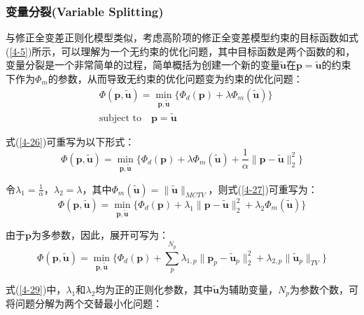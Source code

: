 \documentclass[12pt]{article}
\begin{document}
\subsubsection{变量分裂(Variable Splitting)}
与修正全变差正则化模型类似，考虑高阶项的修正全变差模型约束的目标函数如式(\ref{4-5})所示，可以理解为一个无约束的优化问题，其中目标函数是两个函数的和，变量分裂是一个非常简单的过程，简单概括为创建一个新的变量$\tilde{\boldsymbol{u}}$在$\boldsymbol{p}=\tilde{\boldsymbol{u}}$的约束下作为$\Phi_m$的参数，从而导致无约束的优化问题变为约束的优化问题：
\begin{equation}\label{4-26}
\begin{aligned}
&\Phi(\boldsymbol{p},\tilde{\boldsymbol{u}})=\min_{\boldsymbol{p},\tilde{\boldsymbol{u}}}\{\Phi_d(\boldsymbol{p})+\lambda \Phi_m(\tilde{\boldsymbol{u}})\}\\
&\text{subject to} \quad \boldsymbol{p}=\tilde{\boldsymbol{u}}
\end{aligned}
\end{equation}
\par
式(\ref{4-26})可重写为以下形式：
\begin{equation}\label{4-27}
\Phi(\boldsymbol{p},\tilde{\boldsymbol{u}})=\min_{\boldsymbol{p},\tilde{\boldsymbol{u}}}\{\Phi_d(\boldsymbol{p})+\lambda \Phi_m(\tilde{\boldsymbol{u}})+\frac{1}{\alpha} \parallel \boldsymbol{p}-\tilde{\boldsymbol{u}} \parallel_2^2\}
\end{equation}
\par
令$\lambda_1=\frac{1}{\alpha}$，$\lambda_2=\lambda$，其中$\Phi_m(\tilde{\boldsymbol{u}})=\parallel \tilde{\boldsymbol{u}} \parallel_{MCTV}$，则式(\ref{4-27})可重写为：
\begin{equation}\label{4-28}
\Phi(\boldsymbol{p},\tilde{\boldsymbol{u}})=\min_{\boldsymbol{p},\tilde{\boldsymbol{u}}}\{\Phi_d(\boldsymbol{p})+\lambda_1 \parallel \boldsymbol{p}-\tilde{\boldsymbol{u}} \parallel_2^2 +\lambda_2 \Phi_m(\tilde{\boldsymbol{u}})\}
\end{equation}
\par
由于$\boldsymbol{p}$为多参数，因此，展开可写为：
\begin{equation}\label{4-29}
\Phi(\boldsymbol{p},\tilde{\boldsymbol{u}})=\min_{\boldsymbol{p},\tilde{\boldsymbol{u}}}\{\Phi_d(\boldsymbol{p})+\sum_p^{N_p}\lambda_{1,p}\parallel \boldsymbol{p}_p-\tilde{\boldsymbol{u}}_p \parallel_2^2+\lambda_{2,p}\parallel \tilde{\boldsymbol{u}}_p \parallel_{TV}\}
\end{equation}
\par
式(\ref{4-29})中，$\lambda_1$和$\lambda_2$均为正的正则化参数，其中$\tilde{\boldsymbol{u}}$为辅助变量，$N_p$为参数个数，可将问题分解为两个交替最小化问题：
\end{document}
